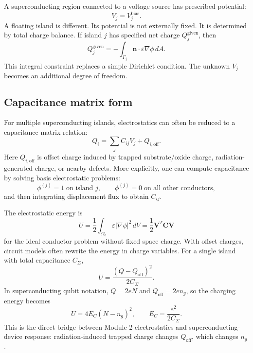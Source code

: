 \documentclass[11pt]{article}
\newcommand{\nvecb}{\mathbf{n}}
\newcommand{\Omd}{\Omega_{\mathrm{d}}}
\newcommand{\Cmat}{\mathbf{C}}
\newcommand{\Vvec}{\mathbf{V}}
\begin{document}
A superconducting region connected to a voltage source has prescribed potential:
\begin{equation}
V_j=V_j^{\mathrm{bias}}.
\end{equation}
A floating island is different. Its potential is not externally fixed. It is determined by total charge balance. If island $j$ has specified net charge $Q_j^{\mathrm{given}}$, then
\begin{equation}
Q_j^{\mathrm{given}} = -\int_{\Gamma_j}\nvecb\cdot\varepsilon\nabla\phi\,dA.
\label{eq:floating_charge_constraint}
\end{equation}
This integral constraint replaces a simple Dirichlet condition. The unknown $V_j$ becomes an additional degree of freedom.

\subsection{Capacitance matrix form}

For multiple superconducting islands, electrostatics can often be reduced to a capacitance matrix relation:
\begin{equation}
\boxed{Q_i = \sum_j C_{ij} V_j + Q_{i,\mathrm{off}}.}
\label{eq:capacitance_matrix}
\end{equation}
Here $Q_{i,\mathrm{off}}$ is offset charge induced by trapped substrate/oxide charge, radiation-generated charge, or nearby defects. More explicitly, one can compute capacitance by solving basis electrostatic problems:
\begin{equation}
\phi^{(j)}=1\;\text{on island }j,\qquad
\phi^{(j)}=0\;\text{on all other conductors},
\end{equation}
and then integrating displacement flux to obtain $C_{ij}$.

The electrostatic energy is
\begin{equation}
U = \frac{1}{2}\int_{\Omd}\varepsilon |\nabla\phi|^2\,dV
= \frac{1}{2}\Vvec^{T}\Cmat\Vvec
\end{equation}
for the ideal conductor problem without fixed space charge. With offset charges, circuit models often rewrite the energy in charge variables. For a single island with total capacitance $C_\Sigma$,
\begin{equation}
U = \frac{(Q-Q_{\mathrm{off}})^2}{2C_\Sigma}.
\label{eq:charging_energy_classical}
\end{equation}
In superconducting qubit notation, $Q=2eN$ and $Q_{\mathrm{off}}=2e n_g$, so the charging energy becomes
\begin{equation}
U = 4E_C (N-n_g)^2,
\qquad
E_C=\frac{e^2}{2C_\Sigma}.
\label{eq:transmon_charging_energy}
\end{equation}
This is the direct bridge between Module 2 electrostatics and superconducting-device response: radiation-induced trapped charge changes $Q_{\mathrm{off}}$, which changes $n_g$.
\end{document}
